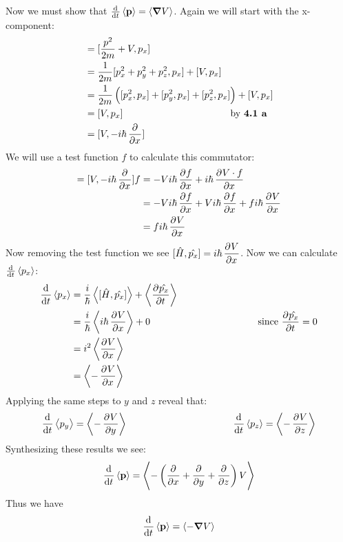\documentclass{scrartcl}
\begin{document}
Now we must show that $\od{}{t}\expval{\vb{p}}=\expval{\grad V}$. Again we will start with the x-component:
\begin{align*}
[\hat{H},\hat{p}]&=[\frac{p^2}{2m}+V,p_x]\\
&=\frac{1}{2m}[p_x^2+p_y^2+p_z^2,p_x]+[V,p_x]\\
&=\frac{1}{2m}\left([p_x^2,p_x]+[p_y^2,p_x]+[p_z^2,p_x]\right)+[V,p_x]\\
&=[V,p_x] \text{\hspace{1.5 in} by \textbf{4.1 a}}\\
&=[V,-i\hbar\dpd{}{x}]\\
\end{align*}
We will use a test function $f$ to calculate this commutator:
\begin{align*}
[V,p_x]=[V,-i\hbar\dpd{}{x}]f&=-Vi\hbar\dpd{f}{x}+i\hbar\dpd{V\cdot f}{x}\\
&=-Vi\hbar\dpd{f}{x}+Vi\hbar\dpd{f}{x}+fi\hbar\dpd{V}{x}\\
&=fi\hbar\dpd{V}{x}
\end{align*}
Now removing the test function we see $[\hat{H},\hat{p_x}]=i\hbar\dpd{V}{x}$. Now we can calculate $\od{}{t}\expval{p_x}$:
\begin{align*}
\dod{}{t}\expval{p_x}&=\frac{i}{\hbar}\expval{[\hat{H},\hat{p_x}]}+\expval{\dpd{\hat{p_x}}{t}}\\
&=\frac{i}{\hbar}\expval{i\hbar\dpd{V}{x}}+0 \text{\hspace{1.5 in} since $\dpd{\hat{p_x}}{t}=0$}\\
&=i^2\expval{\dpd{V}{x}}\\
&=\expval{-\dpd{V}{x}}
\end{align*}
Applying the same steps to $y$ and $z$ reveal that:
\begin{displaymath}
\dod{}{t}\expval{p_y}=\expval{-\dpd{V}{y}} \text{\hspace{1.5 in}} \dod{}{t}\expval{p_z}=\expval{-\dpd{V}{z}}
\end{displaymath}
Synthesizing these results we see:
\begin{displaymath}
\dod{}{t}\expval{\vb{p}}=\expval{-\left(\dpd{}{x}+\dpd{}{y}+\dpd{}{z}\right)V}
\end{displaymath}
Thus we have
\begin{displaymath}
\dod{}{t}\expval{\vb{p}}=\expval{-\grad V}
\end{displaymath}
\end{document}
